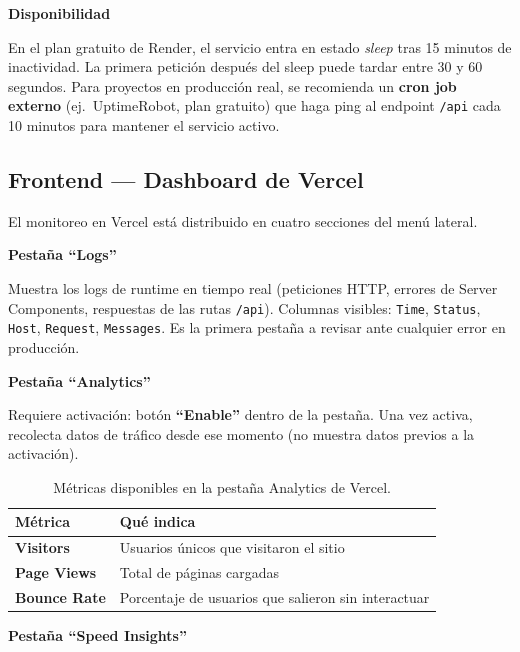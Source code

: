 \documentclass[12pt, a4paper]{article}
\begin{document}
\bigskip
\textbf{Disponibilidad}

En el plan gratuito de Render, el servicio entra en estado \textit{sleep} tras 15 minutos de inactividad.
La primera petición después del sleep puede tardar entre 30 y 60 segundos.
Para proyectos en producción real, se recomienda un \textbf{cron job externo}
(ej.\ UptimeRobot, plan gratuito) que haga ping al endpoint \texttt{/api} cada 10 minutos
para mantener el servicio activo.

\subsection{Frontend --- Dashboard de Vercel}

El monitoreo en Vercel está distribuido en cuatro secciones del menú lateral.

\bigskip
\textbf{Pestaña ``Logs''}

Muestra los logs de runtime en tiempo real (peticiones HTTP, errores de Server Components,
respuestas de las rutas \texttt{/api}).
Columnas visibles: \texttt{Time}, \texttt{Status}, \texttt{Host}, \texttt{Request}, \texttt{Messages}.
Es la primera pestaña a revisar ante cualquier error en producción.

\bigskip
\textbf{Pestaña ``Analytics''}

Requiere activación: botón \textbf{``Enable''} dentro de la pestaña.
Una vez activa, recolecta datos de tráfico desde ese momento (no muestra datos previos a la activación).

\begin{table}[H]
    \centering
    \begin{tabular}{p{4cm} p{9cm}}
        \toprule
        \textbf{Métrica} & \textbf{Qué indica} \\
        \midrule
        \textbf{Visitors}    & Usuarios únicos que visitaron el sitio \\[0.3cm]
        \textbf{Page Views}  & Total de páginas cargadas \\[0.3cm]
        \textbf{Bounce Rate} & Porcentaje de usuarios que salieron sin interactuar \\
        \bottomrule
    \end{tabular}
    \caption{Métricas disponibles en la pestaña Analytics de Vercel.}
\end{table}

\bigskip
\textbf{Pestaña ``Speed Insights''}
\end{document}
